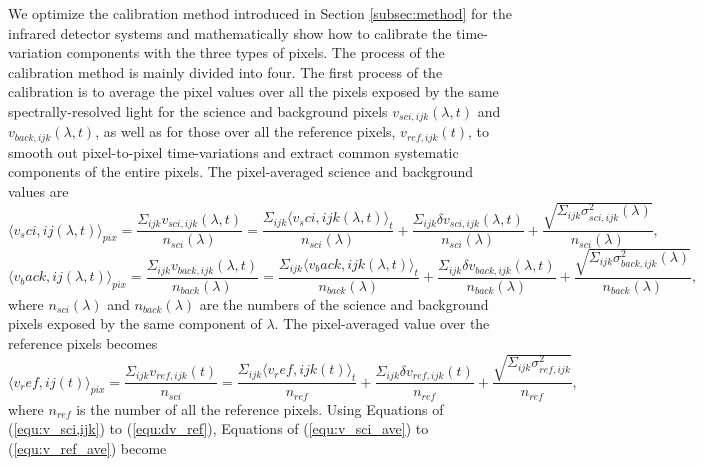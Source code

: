 \documentclass{aastex62}
\def\hoge<#1>{\langle #1 \rangle}
\begin{document}
We optimize the calibration method introduced in Section \ref{subsec:method} for the infrared detector systems and mathematically show how to calibrate the time-variation components with the three types of pixels. The process of the calibration method is mainly divided into four. The first process of the calibration is to average the pixel values over all the pixels exposed by the same spectrally-resolved light for the science and background pixels $v_{sci,ijk}(\lambda,t)$ and $v_{back,ijk}(\lambda,t)$, as well as for those over all the reference pixels, $v_{ref,ijk}(t)$, to smooth out pixel-to-pixel time-variations and extract common systematic components of the entire pixels. The pixel-averaged science and background values are
\begin{equation}
\label{equ:v_sci_ave}
\hoge<v_{sci,ij}(\lambda,t)>_{pix} = \frac{\Sigma_{ijk}v_{sci,ijk}(\lambda,t)}{n_{sci}(\lambda)} = \frac{\Sigma_{ijk}\hoge<v_{sci,ijk}(\lambda,t)>_{t}}{n_{sci}(\lambda)}+\frac{\Sigma_{ijk}{\delta}v_{sci,ijk}(\lambda,t)}{n_{sci}(\lambda)}+\frac{\sqrt{\Sigma_{ijk}\sigma^2_{sci,ijk}(\lambda)}}{n_{sci}(\lambda)} ,
\end{equation}
\begin{equation}
\hoge<v_{back,ij}(\lambda,t)>_{pix} = \frac{\Sigma_{ijk}v_{back,ijk}(\lambda,t)}{n_{back}(\lambda)} = \frac{\Sigma_{ijk}\hoge<v_{back,ijk}(\lambda,t)>_{t}}{n_{back}(\lambda)}+\frac{\Sigma_{ijk}{\delta}v_{back,ijk}(\lambda,t)}{n_{back}(\lambda)}+\frac{\sqrt{\Sigma_{ijk}\sigma^2_{back,ijk}(\lambda)}}{n_{back}(\lambda)} ,
\end{equation}
where $n_{sci}(\lambda)$ and $n_{back}(\lambda)$ are the numbers of the science and background pixels exposed by the same component of $\lambda$. The pixel-averaged value over the reference pixels becomes
\begin{equation}
\label{equ:v_ref_ave}
\hoge<v_{ref,ij}(t)>_{pix} = \frac{\Sigma_{ijk}v_{ref,ijk}(t)}{n_{sci}} = \frac{\Sigma_{ijk}\hoge<v_{ref,ijk}(t)>_{t}}{n_{ref}}+\frac{\Sigma_{ijk}{\delta}v_{ref,ijk}(t)}{n_{ref}}+\frac{\sqrt{\Sigma_{ijk}\sigma^2_{ref,ijk}}}{n_{ref}} ,
\end{equation}
where $n_{ref}$ is the number of all the reference pixels. Using Equations of (\ref{equ:v_sci,ijk}) to (\ref{equ:dv_ref}), Equations of (\ref{equ:v_sci_ave}) to (\ref{equ:v_ref_ave}) become
\end{document}
